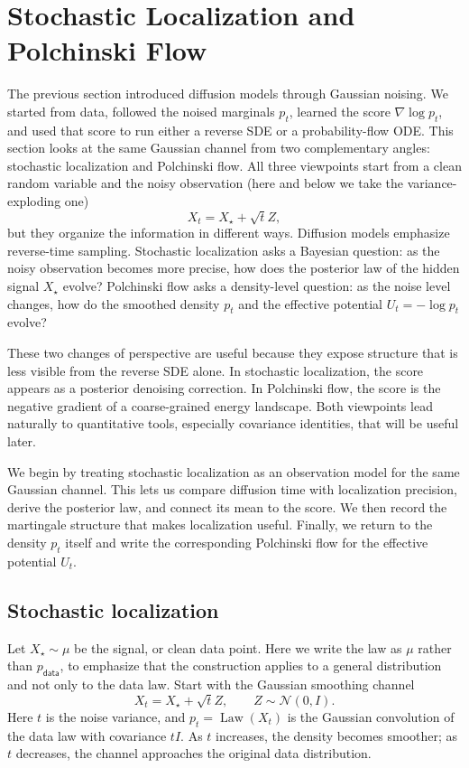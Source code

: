 \documentclass{amsart}
\numberwithin{equation}{section}
\theoremstyle{plain}
\theoremstyle{definition}
\theoremstyle{remark}
\DeclareMathOperator{\Law}{Law}
\newcommand{\Id}{I}
\newcommand{\pdata}{p_{\mathsf{data}}}
\newcommand{\normal}[2]{\mathcal{N}\!\left(#1,#2\right)}
\begin{document}
\section{Stochastic Localization and Polchinski Flow}
\label{sec:stochastic-localization-polchinski}

The previous section introduced diffusion models through Gaussian noising.  We
started from data, followed the noised marginals $p_t$, learned the score
$\nabla\log p_t$, and used that score to run either a reverse SDE or a
probability-flow ODE\@.  This section looks at the same Gaussian channel from two
complementary angles: stochastic localization and Polchinski flow.  All three
viewpoints start from a clean random variable and the noisy observation (here and below we take the variance-exploding one)
\[
    X_t=X_\star+\sqrt{t}Z,
\]
but they organize the information in different ways.  Diffusion models
emphasize reverse-time sampling.  Stochastic localization asks a Bayesian
question: as the noisy observation becomes more precise, how does the posterior
law of the hidden signal $X_\star$ evolve?  Polchinski flow asks a
density-level question: as the noise level changes, how do the smoothed density
$p_t$ and the effective potential $U_t=-\log p_t$ evolve?

These two changes of perspective are useful because they expose structure that
is less visible from the reverse SDE alone.  In stochastic localization, the
score appears as a posterior denoising correction.  In Polchinski flow, the
score is the negative gradient of a coarse-grained energy landscape.  Both
viewpoints lead naturally to quantitative tools, especially covariance
identities, that will be useful later.

We begin by treating stochastic localization as an observation model for the
same Gaussian channel.  This lets us compare diffusion time with localization
precision, derive the posterior law, and connect its mean to the score.  We
then record the martingale structure that makes localization useful.  Finally,
we return to the density $p_t$ itself and write the corresponding
Polchinski flow for the effective potential $U_t$.

\subsection{Stochastic localization}
\label{subsec:stochastic-localization}

Let $X_\star\sim\mu$ be the signal, or clean data point.  Here we write the law
as $\mu$ rather than $\pdata$, to emphasize that the construction applies to a
general distribution and not only to the data law.  Start with the
Gaussian smoothing channel
\[
    X_t=X_\star+\sqrt{t}Z,\qquad Z\sim\normal{0}{\Id}.
\]
Here $t$ is the noise variance, and $p_t=\Law(X_t)$ is the Gaussian
convolution of the data law with covariance $t\Id$.  As $t$ increases,
the density becomes smoother; as $t$ decreases, the channel approaches the
original data distribution.
\end{document}
